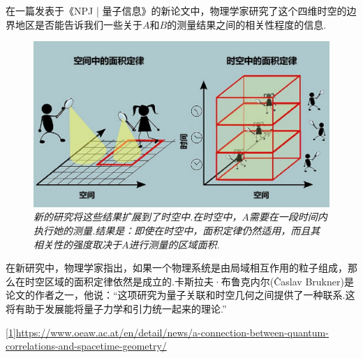 \begin{multicols}{2}
在一篇发表于《NPJ | 量子信息》的新论文中，物理学家研究了这个四维时空的边界地区是否能告诉我们一些关于$A$和$B$的测量结果之间的相关性程度的信息.

\begin{figure}[H]
    \centering
    \includegraphics[width=\linewidth]{IMG/201907/Screenshot_20190725_152404.jpg}
    \caption{\textit{新的研究将这些结果扩展到了时空中.在时空中，$A$需要在一段时间内执行她的测量.结果是：即使在时空中，面积定律仍然适用，而且其相关性的强度取决于$A$进行测量的区域面积.}}
    
\end{figure}

在新研究中，物理学家指出，如果一个物理系统是由局域相互作用的粒子组成，那么在时空区域的面积定律依然是成立的.卡斯拉夫·布鲁克内尔(Ĉaslav Brukner)是论文的作者之一，他说：“这项研究为量子关联和时空几何之间提供了一种联系.这将有助于发展能将量子力学和引力统一起来的理论.”
\end{multicols}\vfill

\noindent{}

\noindent\url{[1]https://www.oeaw.ac.at/en/detail/news/a-connection-between-quantum-correlations-and-spacetime-geometry/}\vfill

\ADhairui





